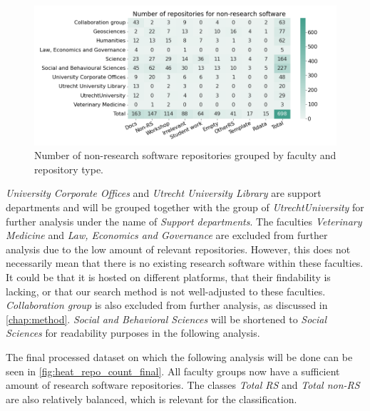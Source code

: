 \begin{figure}[h!]
\centerline{
\includegraphics[scale=0.45]{figures_results/heatmap_repo_count_non_rs.png}}
\vspace{-0.3cm}
\caption{Number of non-research software repositories grouped by faculty and repository type.
\label{fig:heat_repo_count_non_rs}}
\end{figure}

\textit{University Corporate Offices} and \textit{Utrecht University Library} are support departments and will be grouped together with the group of \textit{UtrechtUniversity} for further analysis under the name of \textit{Support departments}. 
The faculties \textit{Veterinary Medicine} and \textit{Law, Economics and Governance} are excluded from further analysis due to the low amount of relevant repositories. 
However, this does not necessarily mean that there is no existing research software within these faculties. It could be that it is hosted on different platforms, that their findability is lacking, or that our search method is not well-adjusted to these faculties.
\textit{Collaboration group} is also excluded from further analysis, as discussed in \autoref{chap:method}. \textit{Social and Behavioral Sciences} will be shortened to \textit{Social Sciences} for readability purposes in the following analysis.


The final processed dataset on which the following analysis will be done can be seen in \autoref{fig:heat_repo_count_final}. All faculty groups now have a sufficient amount of research software repositories. The classes \textit{Total RS} and \textit{Total non-RS} are also relatively balanced, which is relevant for the classification.
\vspace{-0.2cm}

